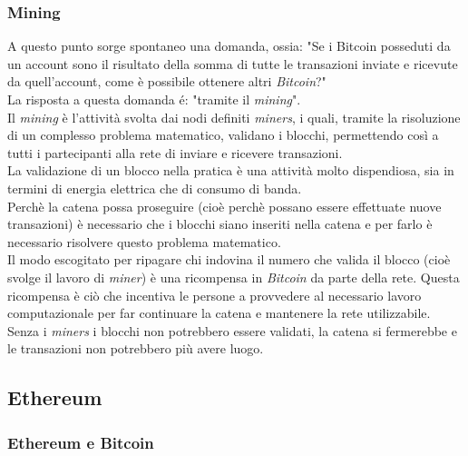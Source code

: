 \documentclass[11pt]{thesistemp}
\begin{document}
\subsubsection{Mining}
A questo punto sorge spontaneo una domanda, ossia: "Se i Bitcoin posseduti da un account sono il risultato della somma di tutte le transazioni inviate e ricevute da quell'account, come è possibile ottenere altri \textit{Bitcoin}?"\\
La risposta a questa domanda é: "tramite il \textit{mining}".\\
Il \textit{mining} è l'attività svolta dai nodi definiti \textit{miners}, i quali, tramite la risoluzione di un complesso problema matematico, validano i blocchi, permettendo così a tutti i partecipanti alla rete di inviare e ricevere transazioni.\\
La validazione di un blocco nella pratica è una attività molto dispendiosa, sia in termini di energia elettrica che di consumo di banda.\\
Perchè la catena possa proseguire (cioè perchè possano essere effettuate nuove transazioni) è necessario che i blocchi siano inseriti nella catena e per farlo è necessario risolvere questo problema matematico.\\
Il modo escogitato per ripagare chi indovina il numero che valida il blocco (cioè svolge il lavoro di \textit{miner}) è una ricompensa in \textit{Bitcoin} da parte della rete. 
Questa ricompensa è ciò che incentiva le persone a provvedere al necessario lavoro computazionale per far continuare la catena e mantenere la rete utilizzabile. Senza i \textit{miners} i blocchi non potrebbero essere validati, la catena si fermerebbe e le transazioni non potrebbero più avere luogo.

\pagebreak
\subsection{Ethereum}

\subsubsection{Ethereum e Bitcoin}
\end{document}
